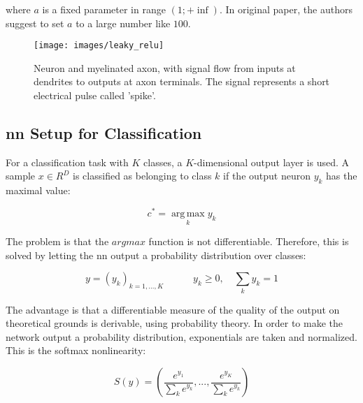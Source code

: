 \noindent where $a$ is a fixed parameter in range $(1; +\inf)$. In original paper, the authors suggest to set $a$ to a large number like $100$.

\begin{figure}[H]
	\centering
	\texttt{[image: images/leaky\_relu]}
	\caption[Leaky Rectified linear activation.]{Neuron and myelinated axon, with signal flow from inputs at dendrites to outputs at axon terminals. The signal represents a short electrical pulse called 'spike'.}
	\label{fig:leakyrelu}
\end{figure}

\subsection{\gls{nn} Setup for Classification}
\label{nn:nnclassification}
For a classification task with $K$ classes, a $K$-dimensional output layer is used. A sample $x \in R^D$ is classified as belonging to class $k$ if the output neuron $y_k$ has the maximal value:

\begin{Equation}[H]
	\centering
	\begin{equation} \label{eq:nnclass}
		c^*= \operatorname*{arg\,max}_k  y_k
	\end{equation}
\end{Equation}

\noindent The problem is that the $arg max$ function is not differentiable. Therefore, this is solved by letting the \gls{nn} output a probability distribution over classes:

\begin{Equation}[H]
	\centering
	\begin{equation} \label{eq:nnclass2}
		y = (y_k)_{k=1,...,K}
		\quad
		\quad
		\quad
		y_k \geq 0,
		\quad
		\sum_{k} y_k = 1
	\end{equation}
\end{Equation}

\noindent The advantage is that a differentiable measure of the quality of the output on theoretical grounds is derivable, using probability theory. In order to make the network output a probability distribution, exponentials are taken and normalized. This is the softmax nonlinearity:

\begin{Equation}[H]
	\centering
	\begin{equation} \label{eq:softmax}
		S(y) = (\frac{e^{y_1}}{\sum_k e^{y_k}},...,\frac{e^{y_K}}{\sum_k e^{y_k}})
	\end{equation}
	\caption[Softmax nonlinearity.]{Softmax nonlinearity.}
\end{Equation}

